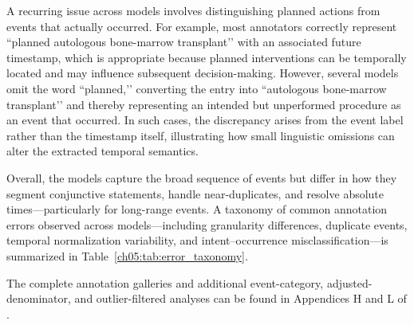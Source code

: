 A recurring issue across models involves distinguishing planned actions from events that actually occurred.
For example, most annotators correctly represent “planned autologous bone-marrow transplant’’ with an associated future timestamp, which is appropriate because planned interventions can be temporally located and may influence subsequent decision-making.
However, several models omit the word “planned,’’ converting the entry into “autologous
bone-marrow transplant’’ and thereby representing an intended but unperformed procedure as an event that occurred.
In such cases, the discrepancy arises from the event label rather than the timestamp itself, illustrating how small linguistic omissions can alter the extracted temporal semantics.




Overall, the models capture the broad sequence of events but differ in how they segment conjunctive statements, handle near-duplicates, and resolve absolute times—particularly for
long-range events.
A taxonomy of common annotation errors observed across models—including granularity differences, duplicate events, temporal normalization variability, and intent–occurrence misclassification—is summarized in Table~\ref{ch05:tab:error_taxonomy}.



The complete annotation galleries and additional event-category, adjusted-denominator, and outlier-filtered analyses can be found in Appendices H and L of \citep{pmlr-v333-noroozizadeh26a}.

